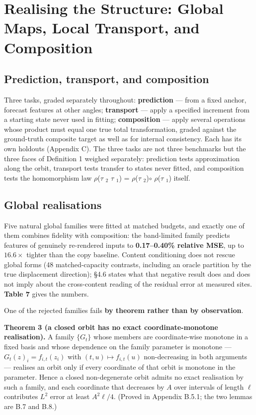 \section{Realising the Structure: Global Maps, Local Transport, and Composition}

\subsection{Prediction, transport, and composition}

Three tasks, graded separately throughout: \textbf{prediction} --- from a fixed anchor, forecast features at other angles; \textbf{transport} --- apply a specified increment from a starting state never used in fitting; \textbf{composition} --- apply several operations whose product must equal one true total transformation, graded against the ground-truth composite target as well as for internal consistency. Each has its own holdouts (Appendix C). The three tasks are not three benchmarks but the three faces of Definition 1 weighed separately: prediction tests approximation along the orbit, transport tests transfer to states never fitted, and composition tests the homomorphism law $\rho$($\tau$ $_2$ $\tau$ $_1$) = $\rho$($\tau$ $_2$)$\circ$ $\rho$($\tau$ $_1$) itself.

\subsection{Global realisations}

Five natural global families were fitted at matched budgets, and exactly one of them combines fidelity with composition: the band-limited family predicts features of genuinely re-rendered inputs to \textbf{0.17--0.40\% relative MSE}, up to $16.6\times$ tighter than the copy baseline. Content conditioning does not rescue global forms (48 matched-capacity contrasts, including an oracle partition by the true displacement direction); \S{}4.6 states what that negative result does and does not imply about the cross-content reading of the residual error at measured sites. \textbf{Table 7} gives the numbers.

One of the rejected families fails \textbf{by theorem rather than by observation}.

\textbf{Theorem 3 (a closed orbit has no exact coordinate-monotone realisation).} A family $\{G_t\}$ whose members are coordinate-wise monotone in a fixed basis and whose dependence on the family parameter is monotone --- $G_t(z)_i=f_{i,t}(z_i)$ with $(t,u)\mapsto f_{i,t}(u)$ non-decreasing in both arguments --- realises an orbit only if every coordinate of that orbit is monotone in the parameter. Hence a closed non-degenerate orbit admits no exact realisation by such a family, and each coordinate that decreases by $A$ over intervals of length $\ell$ contributes $L^2$ error at least $A^2\ell/4$. (Proved in Appendix B.5.1; the two lemmas are B.7 and B.8.)

